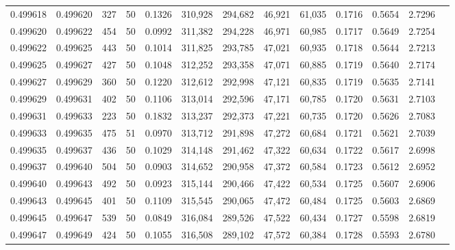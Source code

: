 \begin{tabular}{rrrrrrrrrrrrr}
0.499618 & 0.499620 & 327 &  50 &                                     0.1326 & 310,928 & 294,682 &  46,921 &  61,035 & 0.1716 & 0.5654 & 2.7296 \\
0.499620 & 0.499622 & 454 &  50 &                                     0.0992 & 311,382 & 294,228 &  46,971 &  60,985 & 0.1717 & 0.5649 & 2.7254 \\
0.499622 & 0.499625 & 443 &  50 &                                     0.1014 & 311,825 & 293,785 &  47,021 &  60,935 & 0.1718 & 0.5644 & 2.7213 \\
0.499625 & 0.499627 & 427 &  50 &                                     0.1048 & 312,252 & 293,358 &  47,071 &  60,885 & 0.1719 & 0.5640 & 2.7174 \\
0.499627 & 0.499629 & 360 &  50 &                                     0.1220 & 312,612 & 292,998 &  47,121 &  60,835 & 0.1719 & 0.5635 & 2.7141 \\
0.499629 & 0.499631 & 402 &  50 &                                     0.1106 & 313,014 & 292,596 &  47,171 &  60,785 & 0.1720 & 0.5631 & 2.7103 \\
0.499631 & 0.499633 & 223 &  50 &                                     0.1832 & 313,237 & 292,373 &  47,221 &  60,735 & 0.1720 & 0.5626 & 2.7083 \\
0.499633 & 0.499635 & 475 &  51 &                                     0.0970 & 313,712 & 291,898 &  47,272 &  60,684 & 0.1721 & 0.5621 & 2.7039 \\
0.499635 & 0.499637 & 436 &  50 &                                     0.1029 & 314,148 & 291,462 &  47,322 &  60,634 & 0.1722 & 0.5617 & 2.6998 \\
0.499637 & 0.499640 & 504 &  50 &                                     0.0903 & 314,652 & 290,958 &  47,372 &  60,584 & 0.1723 & 0.5612 & 2.6952 \\
0.499640 & 0.499643 & 492 &  50 &                                     0.0923 & 315,144 & 290,466 &  47,422 &  60,534 & 0.1725 & 0.5607 & 2.6906 \\
0.499643 & 0.499645 & 401 &  50 &                                     0.1109 & 315,545 & 290,065 &  47,472 &  60,484 & 0.1725 & 0.5603 & 2.6869 \\
0.499645 & 0.499647 & 539 &  50 &                                     0.0849 & 316,084 & 289,526 &  47,522 &  60,434 & 0.1727 & 0.5598 & 2.6819 \\
0.499647 & 0.499649 & 424 &  50 &                                     0.1055 & 316,508 & 289,102 &  47,572 &  60,384 & 0.1728 & 0.5593 & 2.6780 \\

\end{tabular}
